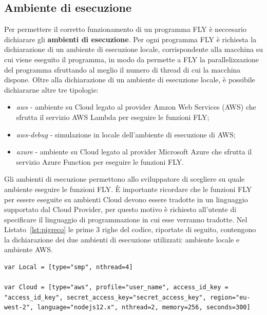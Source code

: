\subsection{Ambiente di esecuzione}
Per permettere il corretto funzionamento di un programma FLY è neccesario dichiarare gli \textbf{ambienti di esecuzione}. Per ogni programma FLY è richiesta la dichiarazione di un ambiente di esecuzione locale, corrispondente alla macchina su cui viene eseguito il programma, in modo da permette a FLY la parallelizzazione del programma sfruttando al meglio il numero di thread di cui la macchina dispone. Oltre alla dichiarazione di un ambiente di esecuzione locale, è possibile dichiararne altre tre tipologie:
\begin{itemize}
    \item \textit{aws} - ambiente su Cloud legato al provider Amzon Web Services (AWS) che sfrutta il servizio AWS Lambda \cite{lambdasite} per eseguire le funzioni FLY;
    \item \textit{aws-debug} - simulazione in locale dell'ambiente di esecuzione di AWS;
    \item \textit{azure} - ambiente su Cloud legato al provider Microsoft Azure \cite{MicrosoftSite} che sfrutta il servizio Azure Function \cite{FunctionSite} per eseguire le funzioni FLY.
\end{itemize}
Gli ambienti di esecuzione permettono allo sviluppatore di scegliere su quale ambiente eseguire le funzioni FLY. È importante ricordare che le funzioni FLY per essere eseguite su ambienti Cloud devono essere tradotte in un linguaggio supportato dal Cloud Provider, per questo motivo è richiesto all'utente di specificare il linguaggio di programmazione in cui esse verranno tradotte. Nel Listato~\ref{lst:pigreco} le prime 3 righe del codice, riportate di seguito, contengono la dichiarazione dei due ambienti di esecuzione utilizzati: ambiente locale e ambiente AWS.
\begin{lstlisting}[language=FLY,label={lst:r},belowskip=-0.8 \baselineskip]
var Local = [type="smp", nthread=4]

var Cloud = [type="aws", profile="user_name", access_id_key = "access_id_key", secret_access_key="secret_access_key", region="eu-west-2", language="nodejs12.x", nthread=2, memory=256, seconds=300]
\end{lstlisting}

